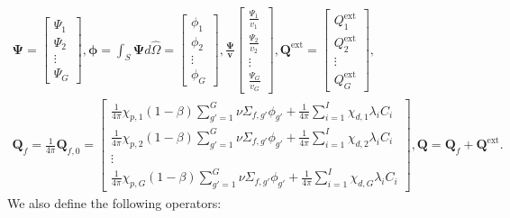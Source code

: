 \begin{gather}
  \bm{\Psi} =
  \begin{bmatrix}
    \Psi_1 \\
    \Psi_2 \\
    \vdots \\
    \Psi_G
  \end{bmatrix},
  \bm{\phi} = \int_S \bm{\Psi}d\hat{\Omega} =
  \begin{bmatrix}
    \phi_1 \\
    \phi_2 \\
    \vdots \\
    \phi_G
  \end{bmatrix},
  \bm{\frac{\Psi}{v}}
  \begin{bmatrix}
    \frac{\Psi_1}{v_1} \\
    \frac{\Psi_2}{v_2} \\
    \vdots \\
    \frac{\Psi_G}{v_G}
  \end{bmatrix},
  \bm{Q}^{\text{ext}} =
  \begin{bmatrix}
    Q^\text{ext}_1 \\
    Q^\text{ext}_2 \\
    \vdots \\
    Q^\text{ext}_G
  \end{bmatrix}, \nonumber \\
  \bm{Q}_f = \frac{1}{4\pi}\bm{Q}_{f,0} =
  \begin{bmatrix}
    \frac{1}{4\pi}\chi_{p,1}(1-\beta)\sum^G_{g'=1} \nu\Sigma_{f,g'} \phi_{g'} +
    \frac{1}{4\pi}\sum^I_{i=1}\chi_{d,1} \lambda_i C_i \\
    \frac{1}{4\pi}\chi_{p,2}(1-\beta)\sum^G_{g'=1} \nu\Sigma_{f,g'} \phi_{g'} +
    \frac{1}{4\pi}\sum^I_{i=1}\chi_{d,2} \lambda_i C_i \\
    \vdots \\
    \frac{1}{4\pi}\chi_{p,G}(1-\beta)\sum^G_{g'=1} \nu\Sigma_{f,g'} \phi_{g'} +
    \frac{1}{4\pi}\sum^I_{i=1}\chi_{d,G} \lambda_i C_i
  \end{bmatrix},
  \bm{Q} = \bm{Q}_f + \bm{Q}^\text{ext}. \nonumber
\end{gather}
%
We also define the following operators:
%

